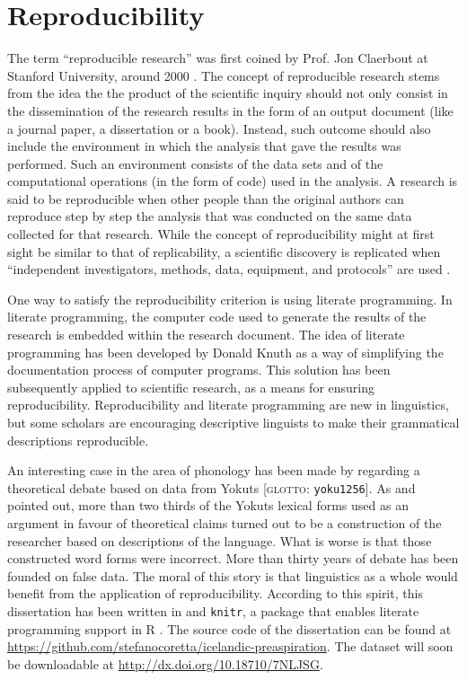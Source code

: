 \documentclass[11pt,a4paper,openany]{memoir}\usepackage[]{graphicx}\usepackage[]{color}
\begin{document}
\section{Reproducibility}
The term ``reproducible research'' was first coined by Prof. Jon Claerbout at Stanford University, around 2000 \citep{fomel2009}.
The concept of reproducible research stems from the idea the the product of the scientific inquiry should not only consist in the dissemination of the research results in the form of an output document (like a journal paper, a dissertation or a book).
Instead, such outcome should also include the environment in which the analysis that gave the results was performed.
Such an environment consists of the data sets and of the computational operations (in the form of code) used in the analysis.
A research is said to be reproducible when other people than the original authors can reproduce step by step the analysis that was conducted on the same data collected for that research.
While the concept of reproducibility might at first sight be similar to that of replicability, a scientific discovery is replicated when ``independent investigators, methods, data, equipment, and protocols'' are used \citep{peng2009}.

One way to satisfy the reproducibility criterion is using literate programming.
In literate programming, the computer code used to generate the results of the research is embedded within the research document.
The idea of literate programming has been developed by Donald Knuth \citep{knuth1984} as a way of simplifying the documentation process of computer programs.
This solution has been subsequently applied to scientific research, as a means for ensuring reproducibility.
Reproducibility and literate programming are new in linguistics, but some scholars are encouraging descriptive linguists to make their grammatical descriptions reproducible.

An interesting case in the area of phonology has been made by \citet{maxwell2013} regarding a theoretical debate based on data from Yokuts [\textsc{glotto}: \texttt{yoku1256}].
As \citet{weigel2002} and \citet{blevins2004a} pointed out, more than two thirds of the Yokuts lexical forms used as an argument in favour of theoretical claims turned out to be a construction of the researcher based on descriptions of the language.
What is worse is that those constructed word forms were incorrect.
More than thirty years of debate has been founded on false data.
The moral of this story is that linguistics as a whole would benefit from the application of reproducibility.
According to this spirit, this dissertation has been written in \XeLaTeX{} and \texttt{knitr}, a package that enables literate programming support in R \citep{r-core-team2015}.
The source code of the dissertation can be found at \url{https://github.com/stefanocoretta/icelandic-preaspiration}.
The dataset will soon be downloadable at \url{http://dx.doi.org/10.18710/7NLJSG}.
\end{document}
